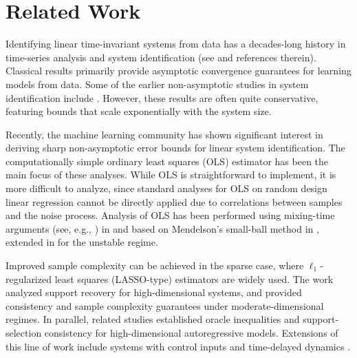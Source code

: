 \documentclass[11pt]{article}
\begin{document}
\section{Related Work}

Identifying linear time-invariant systems from data has a decades-long history in time-series analysis and system identification (see \cite{ljung1987theory,van2012subspace,galrinho2016least} and references therein). Classical results primarily provide asymptotic convergence guarantees for learning models from data. Some of the earlier non-asymptotic studies in system identification include \cite{weyer2002finite,campi2002finite,vidyasagar2008learning}. However, these results are often quite conservative, featuring bounds that scale exponentially with the system size.

Recently, the machine learning community has shown significant interest in deriving sharp non-asymptotic error bounds for linear system identification. The computationally simple ordinary least squares (OLS) estimator has been the main focus of these analyses. While OLS is straightforward to implement, it is more difficult to analyze, since standard analyses for OLS on random design linear regression \cite{hsu2014random} cannot be directly applied due to correlations between samples and the noise process. Analysis of OLS has been performed using mixing-time arguments (see, e.g., \cite{yu1994rates}) in \cite{faradonbeh2018finite} and based on Mendelson’s small-ball method in \cite{simchowitz2018learning}, extended in \cite{sarkar2019near} for the unstable regime.

Improved sample complexity can be achieved in the sparse case, where $\ell_1$-regularized least squares (LASSO-type) estimators are widely used. The work \cite{Bento2010learning} analyzed support recovery for high-dimensional systems, and \cite{nardi2011autoregressive} provided consistency and sample complexity guarantees under moderate-dimensional regimes. In parallel, related studies \cite{song2011large, kock2015oracle} established oracle inequalities and support-selection consistency for high-dimensional autoregressive models. Extensions of this line of work include systems with control inputs \cite{fattahi2019learning} and time-delayed dynamics \cite{han2015direct}.
\end{document}
